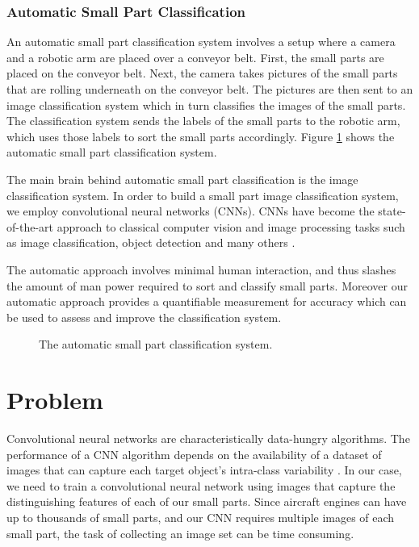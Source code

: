 \subsubsection{Automatic Small Part Classification}

An automatic small part classification system involves a setup where a camera and a robotic arm are placed over a conveyor belt. First, the small parts are placed on the conveyor belt. Next, the camera takes pictures of the small parts that are rolling underneath on the conveyor belt. The pictures are then sent to an image classification system which in turn classifies the images of the small parts. The classification system sends the labels of the small parts to the robotic arm, which uses those labels to sort the small parts accordingly. Figure \ref{fig:automatic_system} shows the automatic small part classification system.

The main brain behind automatic small part classification is the image classification system. In order to build a small part image classification system, we employ convolutional neural networks (CNNs). CNNs have become the state-of-the-art approach to classical computer vision and image processing tasks such as image classification, object detection and many others \cite{ILSVRC15}.

The automatic approach involves minimal human interaction, and thus slashes the amount of man power required to sort and classify small parts. Moreover our automatic approach provides a quantifiable measurement for accuracy which can be used to assess and improve the classification system.

\begin{figure}[H]
\centering
{}
\caption{The automatic small part classification system.}
\label{fig:automatic_system}
\end{figure}


\section{Problem}

Convolutional neural networks are characteristically data-hungry algorithms. The performance of a CNN algorithm depends on the availability of a dataset of images that can capture each target object's intra-class variability \cite{krizhevsky2012imagenet}. In our case, we need to train a convolutional neural network using images that capture the distinguishing features of each of our small parts. Since aircraft engines can have up to thousands of small parts, and our CNN requires multiple images of each small part, the task of collecting an image set can be time consuming.

